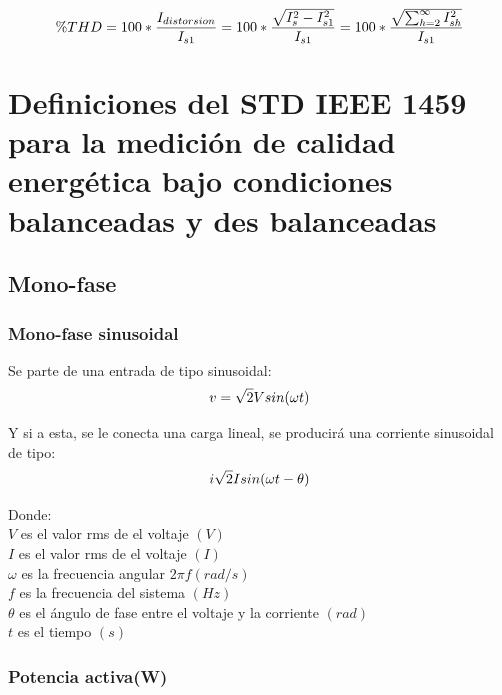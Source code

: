 \begin{equation}\label{EQ13}
\%THD = 100*\frac{I_{distorsion}}{I_{s1}}\\
=100*\frac{\sqrt{I^2_{s}-I^2_{s1}}}{I_{s1}}\\
=100*\frac{\sqrt{\sum_{h=2}^{\infty}I^2_{sh}}}{I_{s1}}\\
\end{equation}



\section{ Definiciones del STD IEEE 1459 para la medición de calidad energética bajo condiciones balanceadas y des balanceadas }
\subsection{Mono-fase}
\subsubsection{Mono-fase sinusoidal}

Se parte de una entrada de tipo sinusoidal:\\
\begin{equation}\label{EQ14}
v=\sqrt{2}V sin(\omega t)\\
\end{equation}

Y si a esta, se le conecta una carga lineal, se producirá una corriente sinusoidal de tipo:\\

\begin{equation}\label{EQ15}
i\sqrt{2}I sin(\omega t - \theta)\\
\end{equation}

Donde:\\
$V$ es el valor rms de el voltaje $(V)$\\
$I$ es el valor rms de el voltaje $(I)$\\
$\omega$ es la frecuencia angular  $2\pi f(rad/s)$\\
$f$ es la frecuencia del sistema $(Hz)$\\
$\theta$ es el ángulo de fase entre el voltaje y la corriente  $(rad)$\\
$t$ es el tiempo $(s)$\\
\subsubsection{Potencia activa(W)}


